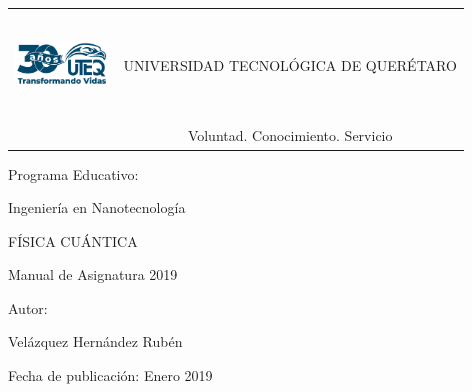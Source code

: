 \pagestyle{empty}

\bgroup\sffamily

\noindent
\begin{tabular}{|c|c|} 
\hline

\includegraphics[width=2.5cm,height=2.8cm]{Figuras/LogoUTEQ}&	
\Large { UNIVERSIDAD TECNOLÓGICA DE QUERÉTARO} \\
	        &Voluntad. Conocimiento. Servicio\\
\hline	
\end{tabular}
\vspace{1.5cm}
\begin{center}
\large {Programa Educativo:}

\vspace{1cm}
Ingeniería en Nanotecnología 

\vspace{2cm}
\Large{FÍSICA CUÁNTICA}

Manual de Asignatura 2019
\end{center}
\vspace{2cm}

\begin{large}
Autor:

Velázquez Hernández Rubén

Fecha de publicación: Enero 2019
\end{large}
